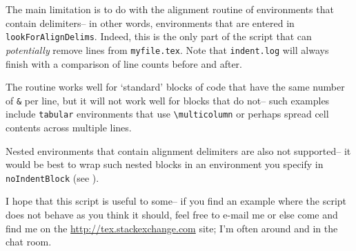  The main limitation is to do with the alignment routine of environments that contain 
 delimiters-- in other words, environments that are entered in \lstinline!lookForAlignDelims!.
 Indeed, this is the only part of the script that can \emph{potentially} remove 
 lines from \lstinline!myfile.tex!. Note that \lstinline!indent.log! will always
 finish with a comparison of line counts before and after. 
      
 The routine works well for `standard' blocks of code that have the same number of \lstinline!&!
 per line, but it will not work well for blocks that do not-- such examples 
 include \lstinline!tabular! environments that use \lstinline!\multicolumn! or 
 perhaps spread cell contents across multiple lines.
      
 Nested environments that contain alignment delimiters are also not supported-- it 
 would be best to wrap such nested blocks in an environment you specify in \lstinline!noIndentBlock! (see ).
      
 I hope that this script is useful to some-- if you find an example where the 
 script does not behave as you think it should, feel free to e-mail me or else
 come and find me on the \url{http://tex.stackexchange.com} site; I'm often around 
 and in the chat room.
      
 \printbibliography[heading=bibintoc]
 
      
